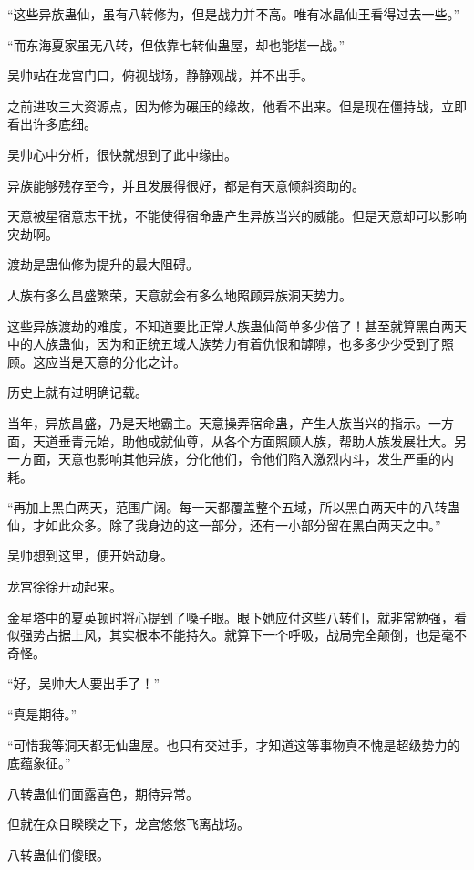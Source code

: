 
\begin{this_body}

“这些异族蛊仙，虽有八转修为，但是战力并不高。唯有冰晶仙王看得过去一些。”

“而东海夏家虽无八转，但依靠七转仙蛊屋，却也能堪一战。”

吴帅站在龙宫门口，俯视战场，静静观战，并不出手。

之前进攻三大资源点，因为修为碾压的缘故，他看不出来。但是现在僵持战，立即看出许多底细。

吴帅心中分析，很快就想到了此中缘由。

异族能够残存至今，并且发展得很好，都是有天意倾斜资助的。

天意被星宿意志干扰，不能使得宿命蛊产生异族当兴的威能。但是天意却可以影响灾劫啊。

渡劫是蛊仙修为提升的最大阻碍。

人族有多么昌盛繁荣，天意就会有多么地照顾异族洞天势力。

这些异族渡劫的难度，不知道要比正常人族蛊仙简单多少倍了！甚至就算黑白两天中的人族蛊仙，因为和正统五域人族势力有着仇恨和罅隙，也多多少少受到了照顾。这应当是天意的分化之计。

历史上就有过明确记载。

当年，异族昌盛，乃是天地霸主。天意操弄宿命蛊，产生人族当兴的指示。一方面，天道垂青元始，助他成就仙尊，从各个方面照顾人族，帮助人族发展壮大。另一方面，天意也影响其他异族，分化他们，令他们陷入激烈内斗，发生严重的内耗。

“再加上黑白两天，范围广阔。每一天都覆盖整个五域，所以黑白两天中的八转蛊仙，才如此众多。除了我身边的这一部分，还有一小部分留在黑白两天之中。”

吴帅想到这里，便开始动身。

龙宫徐徐开动起来。

金星塔中的夏英顿时将心提到了嗓子眼。眼下她应付这些八转们，就非常勉强，看似强势占据上风，其实根本不能持久。就算下一个呼吸，战局完全颠倒，也是毫不奇怪。

“好，吴帅大人要出手了！”

“真是期待。”

“可惜我等洞天都无仙蛊屋。也只有交过手，才知道这等事物真不愧是超级势力的底蕴象征。”

八转蛊仙们面露喜色，期待异常。

但就在众目睽睽之下，龙宫悠悠飞离战场。

八转蛊仙们傻眼。


\end{this_body}
